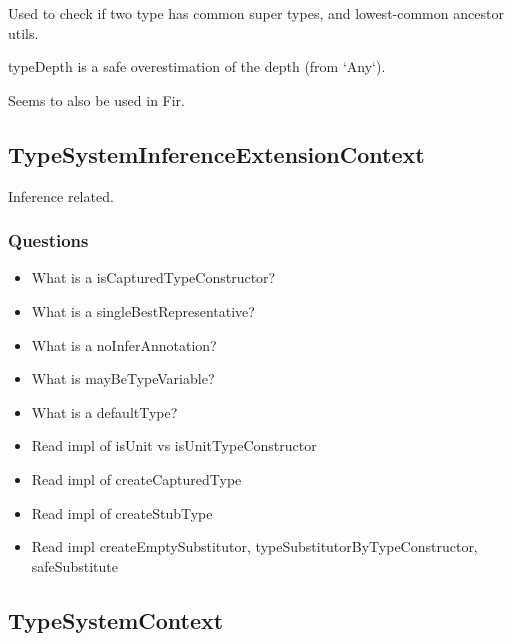 \documentclass{article}
\begin{document}
Used to check if two type has common super types, and lowest-common ancestor utils.

typeDepth is a safe overestimation of the depth (from `Any`).

Seems to also be used in Fir.

\subsection{TypeSystemInferenceExtensionContext}

Inference related.

\subsubsection{Questions}
\begin{itemize}
    \item What is a isCapturedTypeConstructor?
    \item What is a singleBestRepresentative?
    \item What is a noInferAnnotation?
    \item What is mayBeTypeVariable?
    \item What is a defaultType?
    \item Read impl of isUnit vs isUnitTypeConstructor
    \item Read impl of createCapturedType
    \item Read impl of createStubType
    \item Read impl createEmptySubstitutor, typeSubstitutorByTypeConstructor, safeSubstitute
\end{itemize}

\subsection{TypeSystemContext}
\end{document}
